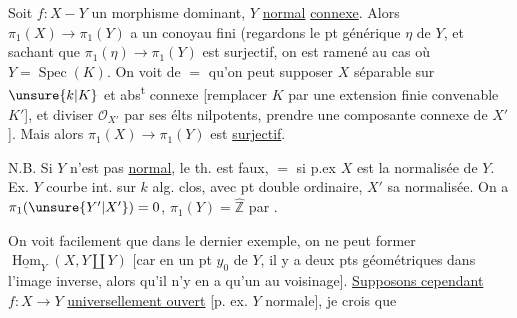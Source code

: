 Soit $f:X-Y$ un morphisme  dominant, $Y$  \uline{normal} \uline{connexe}.
Alors $\pi_1(X)\to\pi_1(Y)$ a un conoyau fini
(regardons le pt générique $\eta$ de $Y$, et sachant que $\pi_1(\eta)\to\pi_1(Y)$ est surjectif, on est ramené au cas où $Y=\operatorname{Spec}(K)$.
On voit de $=$ qu'on peut supposer $X$ séparable sur $\unsure{k|K}$ et abs\textsuperscript{t} connexe
[remplacer $K$ par une extension  finie convenable $K'$], et diviser $\mathcal O_{X'}$ par ses élts nilpotents,  prendre une composante connexe de $X'$].
Mais alors $\pi_1(X)\longrightarrow\pi_1(Y)$ est \uline{surjectif}.


N.B. Si $Y$ n'est pas \uline{normal}, le th. est faux, $=$ si p.ex $X$ est la normalisée de $Y$.
Ex. $Y$ courbe int. sur $k$ alg. clos, avec pt double ordinaire, $X'$ sa normalisée.
On a $\pi_1(\unsure{Y'|X'})=0$, $\pi_1(Y)=\widehat{\mathbb Z}$
   par .


On voit facilement que dans le dernier exemple, on ne peut former $\underline{\operatorname{Hom}}_Y(X,Y\amalg Y)$
[car en un  pt $y_0$ de $Y$, il y a deux pts géométriques dans l'image inverse, alors qu'il n'y en a qu'un au voisinage].
\uline{Supposons cependant} $f:X\to Y$ \uline{universellement ouvert} [p. ex. $Y$ normale], je crois que
